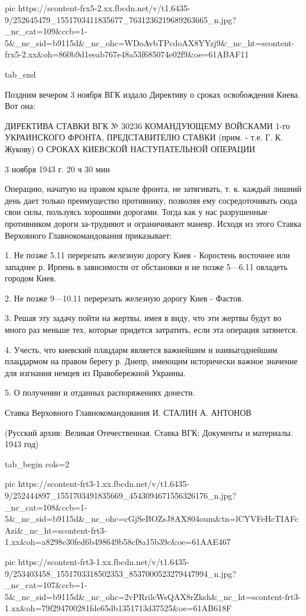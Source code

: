      pic https://scontent-frx5-2.xx.fbcdn.net/v/t1.6435-9/252645479_1551703411835677_7631236219689263665_n.jpg?_nc_cat=109&ccb=1-5&_nc_sid=b9115d&_nc_ohc=WDoAvbTPcdoAX8YYzj9&_nc_ht=scontent-frx5-2.xx&oh=860b9d1eeab767e48a53f685074e02f9&oe=61ABAF11

  tab_end
\fi

Поздним вечером 3 ноября ВГК издало Директиву о сроках освобождения Киева. Вот
она:

ДИРЕКТИВА СТАВКИ ВГК № 30236 КОМАНДУЮЩЕМУ ВОЙСКАМИ 1-го УКРАИНСКОГО ФРОНТА,
ПРЕДСТАВИТЕЛЮ СТАВКИ (прим. - т.е. Г. К. Жукову) О СРОКАХ КИЕВСКОЙ
НАСТУПАТЕЛЬНОЙ ОПЕРАЦИИ

3 ноября 1943 г. 20 ч 30 мин

Операцию, начатую на правом крыле фронта, не затягивать, т. к. каждый лишний
день дает только преимущество противнику, позволяя ему сосредоточивать сюда
свои силы, пользуясь хорошими дорогами. Тогда как у нас разрушенные противником
дороги за-трудняют и ограничивают маневр. Исходя из этого Ставка Верховного
Главнокомандования приказывает:

1. Не позже 5.11 перерезать железную дорогу Киев - Коростень восточнее или
западнее р. Ирпень в зависимости от обстановки и не позже 5—6.11 овладеть
городом Киев.

2. Не позже 9—10.11 перерезать железную дорогу Киев - Фастов.

3. Решая эту задачу пойти на жертвы, имея в виду, что эти жертвы будут во много
раз меньше тех, которые придется затратить, если эта операция затянется.

4. Учесть, что киевский плацдарм является важнейшим и наивыгоднейшим плацдармом
на правом берегу р. Днепр, имеющим исторически важное значение для изгнания
немцев из Правобережной Украины.

5. О получении и отданных распоряжениях донести.

Ставка Верховного Главнокомандования И. СТАЛИН А. АНТОНОВ

(Русский архив: Великая Отечественная. Ставка ВГК: Документы и материалы. 1943
год)

\ifcmt
  tab_begin cols=2

     pic https://scontent-frt3-1.xx.fbcdn.net/v/t1.6435-9/252444897_1551703491835669_4543094671556326176_n.jpg?_nc_cat=108&ccb=1-5&_nc_sid=b9115d&_nc_ohc=cGjSeBOZsJ8AX804oum&tn=lCYVFeHcTIAFcAzi&_nc_ht=scontent-frt3-1.xx&oh=a8298e30fed6b498649b58cf8a15b39c&oe=61AAE467

     pic https://scontent-frt3-1.xx.fbcdn.net/v/t1.6435-9/253403458_1551703318502353_8537000523279447994_n.jpg?_nc_cat=107&ccb=1-5&_nc_sid=b9115d&_nc_ohc=2vPRrilcWsQAX8rZksh&_nc_ht=scontent-frt3-1.xx&oh=79f294700281fde65db1351713d37525&oe=61AB618F

